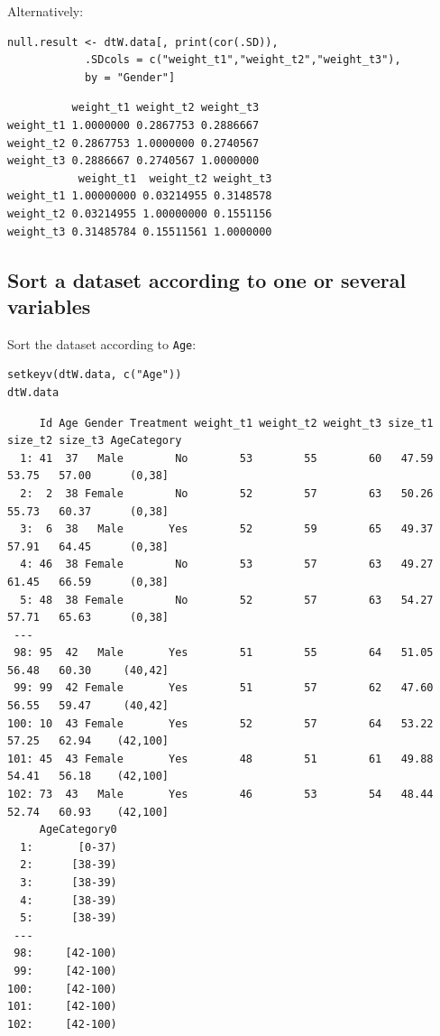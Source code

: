 \documentclass{article}
\begin{document}
Alternatively:
\lstset{language=r,label= ,caption= ,captionpos=b,numbers=none}
\begin{lstlisting}
null.result <- dtW.data[, print(cor(.SD)), 
			.SDcols = c("weight_t1","weight_t2","weight_t3"), 
			by = "Gender"]
\end{lstlisting}

\begin{verbatim}
          weight_t1 weight_t2 weight_t3
weight_t1 1.0000000 0.2867753 0.2886667
weight_t2 0.2867753 1.0000000 0.2740567
weight_t3 0.2886667 0.2740567 1.0000000
           weight_t1  weight_t2 weight_t3
weight_t1 1.00000000 0.03214955 0.3148578
weight_t2 0.03214955 1.00000000 0.1551156
weight_t3 0.31485784 0.15511561 1.0000000
\end{verbatim}

\subsection{Sort a dataset according to one or several variables}
\label{sec:orgb757206}

Sort the dataset according to \texttt{Age}:
\lstset{language=r,label= ,caption= ,captionpos=b,numbers=none}
\begin{lstlisting}
setkeyv(dtW.data, c("Age"))
dtW.data
\end{lstlisting}

\begin{verbatim}
     Id Age Gender Treatment weight_t1 weight_t2 weight_t3 size_t1 size_t2 size_t3 AgeCategory
  1: 41  37   Male        No        53        55        60   47.59   53.75   57.00      (0,38]
  2:  2  38 Female        No        52        57        63   50.26   55.73   60.37      (0,38]
  3:  6  38   Male       Yes        52        59        65   49.37   57.91   64.45      (0,38]
  4: 46  38 Female        No        53        57        63   49.27   61.45   66.59      (0,38]
  5: 48  38 Female        No        52        57        63   54.27   57.71   65.63      (0,38]
 ---                                                                                          
 98: 95  42   Male       Yes        51        55        64   51.05   56.48   60.30     (40,42]
 99: 99  42 Female       Yes        51        57        62   47.60   56.55   59.47     (40,42]
100: 10  43 Female       Yes        52        57        64   53.22   57.25   62.94    (42,100]
101: 45  43 Female       Yes        48        51        61   49.88   54.41   56.18    (42,100]
102: 73  43   Male       Yes        46        53        54   48.44   52.74   60.93    (42,100]
     AgeCategory0
  1:       [0-37)
  2:      [38-39)
  3:      [38-39)
  4:      [38-39)
  5:      [38-39)
 ---             
 98:     [42-100)
 99:     [42-100)
100:     [42-100)
101:     [42-100)
102:     [42-100)
\end{verbatim}
\end{document}

